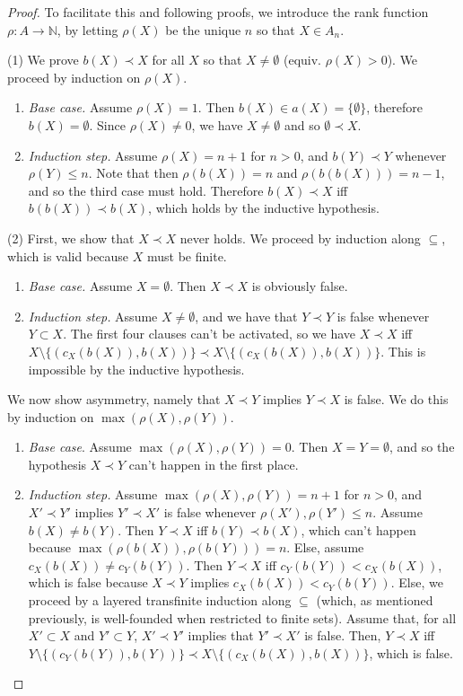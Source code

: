 \documentclass{article}
\theoremstyle{definition}
\theoremstyle{plain}
\theoremstyle{plain}
\theoremstyle{plain}
\theoremstyle{plain}
\theoremstyle{remark}
\theoremstyle{remark}
\theoremstyle{remark}
\theoremstyle{plain}
\theoremstyle{plain}
\begin{document}
\begin{proof}
To facilitate this and following proofs, we introduce the rank function $\rho: A \to \mathbb{N}$, by letting $\rho(X)$ be the unique $n$ so that $X \in A_n$.

(1) We prove $b(X) \prec X$ for all $X$ so that $X \neq \emptyset$ (equiv. $\rho(X) > 0$). We proceed by induction on $\rho(X)$.

\begin{enumerate}
    \item \textit{Base case.} Assume $\rho(X) = 1$. Then $b(X) \in a(X) = \{\emptyset\}$, therefore $b(X) = \emptyset$. Since $\rho(X) \neq 0$, we have $X \neq \emptyset$ and so $\emptyset \prec X$.
    \item \textit{Induction step.} Assume $\rho(X) = n+1$ for $n > 0$, and $b(Y) \prec Y$ whenever $\rho(Y) \leq n$. Note that then $\rho(b(X)) = n$ and $\rho(b(b(X))) = n-1$, and so the third case must hold. Therefore $b(X) \prec X$ iff $b(b(X)) \prec b(X)$, which holds by the inductive hypothesis.
\end{enumerate}

(2) First, we show that $X \prec X$ never holds. We proceed by induction along $\subseteq$, which is valid because $X$ must be finite.

\begin{enumerate}
    \item \textit{Base case.} Assume $X = \emptyset$. Then $X \prec X$ is obviously false.
    \item \textit{Induction step.} Assume $X \neq \emptyset$, and we have that $Y \prec Y$ is false whenever $Y \subset X$. The first four clauses can't be activated, so we have $X \prec X$ iff $X \setminus \{(c_X(b(X)), b(X))\} \prec X \setminus \{(c_X(b(X)), b(X))\}$. This is impossible by the inductive hypothesis.
\end{enumerate}

We now show asymmetry, namely that $X \prec Y$ implies $Y \prec X$ is false. We do this by induction on $\max(\rho(X), \rho(Y))$.

\begin{enumerate}
    \item \textit{Base case}. Assume $\max(\rho(X), \rho(Y)) = 0$. Then $X = Y = \emptyset$, and so the hypothesis $X \prec Y$ can't happen in the first place.
    \item \textit{Induction step.} Assume $\max(\rho(X), \rho(Y)) = n+1$ for $n > 0$, and $X' \prec Y'$ implies $Y' \prec X'$ is false whenever $\rho(X'), \rho(Y') \leq n$. Assume $b(X) \neq b(Y)$. Then $Y \prec X$ iff $b(Y) \prec b(X)$, which can't happen because $\max(\rho(b(X)), \rho(b(Y))) = n$. Else, assume $c_X(b(X)) \neq c_Y(b(Y))$. Then $Y \prec X$ iff $c_Y(b(Y)) < c_X(b(X))$, which is false because $X \prec Y$ implies $c_X(b(X)) < c_Y(b(Y))$. Else, we proceed by a layered transfinite induction along $\subseteq$ (which, as mentioned previously, is well-founded when restricted to finite sets). Assume that, for all $X' \subset X$ and $Y' \subset Y$, $X' \prec Y'$ implies that $Y' \prec X'$ is false. Then, $Y \prec X$ iff $Y \setminus \{(c_Y(b(Y)), b(Y))\} \prec X \setminus \{(c_X(b(X)), b(X))\}$, which is false. 
\end{enumerate}


\end{proof}
\end{document}
